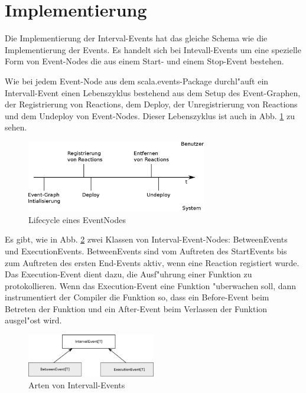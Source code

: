 \section{Implementierung}

Die Implementierung der Interval-Events hat das gleiche Schema wie die
Implementierung der Events. Es handelt sich bei Intevall-Events um eine
spezielle Form von Event-Nodes die aus einem Start- und einem Stop-Event
bestehen.

Wie bei jedem Event-Node aus dem scala.events-Package durchl"auft ein
Intervall-Event einen Lebenszyklus bestehend aus dem Setup des Event-Graphen,
der Registrierung von Reactions, dem Deploy, der Unregistrierung von Reactions
und dem Undeploy von Event-Nodes. Dieser Lebenszyklus ist auch in
Abb. \ref{event_node_lifecycle} zu sehen.

\begin{figure}[htp]
\begin{center}
  \includegraphics[width=0.7\textwidth]{graphics/EventNode-Lifecycle}
  \caption{Lifecycle eines EventNodes}
  \label{event_node_lifecycle}
\end{center}
\end{figure}


Es gibt, wie in Abb. \ref{interval_events_structure} zwei Klassen von
Interval-Event-Nodes: BetweenEvents und ExecutionEvents. BetweenEvents sind vom
Auftreten des StartEvents bis zum Auftreten des ersten End-Events aktiv, wenn
eine Reaction registiert wurde. Das Execution-Event dient dazu, die Ausf"uhrung
einer Funktion zu protokollieren. Wenn das Execution-Event eine Funktion
"uberwachen soll, dann instrumentiert der Compiler die Funktion so, dass ein
Before-Event beim Betreten der Funktion und ein After-Event beim Verlassen der
Funktion ausgel"ost wird.

\begin{figure}[htp]
\begin{center}
  \includegraphics[width=0.5\textwidth]{graphics/interval_event_structure}
  \caption{Arten von Intervall-Events}
  \label{interval_events_structure}
\end{center}
\end{figure}


